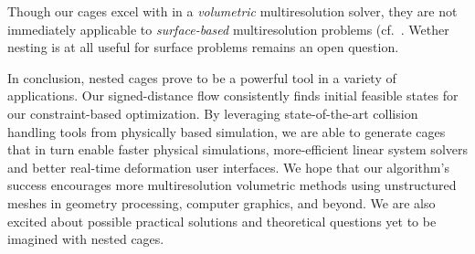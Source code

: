 Though our cages excel with in a \emph{volumetric} multiresolution solver, they
are not immediately applicable to \emph{surface-based} multiresolution problems
(cf.\ \cite{Aksoylu2005msu,Chuang:2009:ELO}. Wether nesting is at all useful
for surface problems remains an open question.

In conclusion, nested cages prove to be a powerful tool in a variety of
applications. 
%
Our signed-distance flow consistently finds initial feasible states for our
constraint-based optimization.
%
By leveraging state-of-the-art collision handling tools from physically based
simulation, we are able to generate cages that in turn enable faster physical
simulations, more-efficient linear system solvers and better real-time
deformation user interfaces.
%
We hope that our algorithm's success encourages more multiresolution volumetric
methods using unstructured meshes in geometry processing, computer graphics,
and beyond.
%
We are also excited about possible practical solutions and theoretical
questions yet to be imagined with nested cages.
